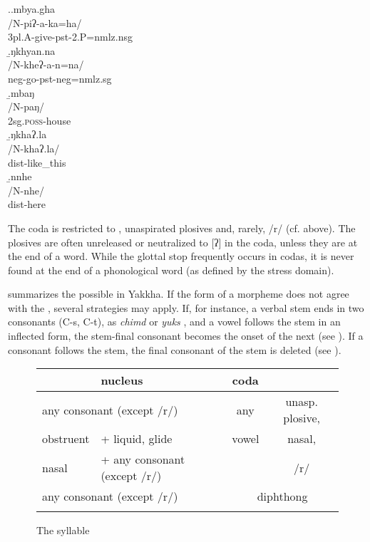 \ex.\a.\glll	mbya.gha\\
			/N-piʔ-a-ka=ha/\\
			{\sc 3pl.A-}give{\sc -pst-2.P=nmlz.nsg}\\
			\b.\glll ŋkhyan.na\\
			/N-kheʔ-a-n=na/\\
			{\sc neg-}go{\sc [3sg]-pst-neg=nmlz.sg}\\
			\b.\glll	mbaŋ\\
			/N-paŋ/\\
			{\sc 2sg.\textsc{poss}-}house\\
			\b.\glll ŋkhaʔ.la\\
			/N-khaʔ.la/\\
			{\sc dist-}like\_this\\
			\b.\glll  nnhe\\
			/N-nhe/\\
			{\sc dist-}here\\



The coda is restricted to , unaspirated plosives  and, rarely, /r/ (cf.  above). The plosives are often unreleased or neutralized to [ʔ] in the coda, unless they are at the end of a word. While the glottal stop frequently occurs in  codas, it  is never found at the end of a phonological word (as defined by the stress domain).  


 summarizes the possible  in Yakkha. If the form of a morpheme does not agree with the , several strategies may apply. If, for instance, a verbal stem ends in two consonants (C-s, C-t), as \emph{chimd}  or \emph{yuks} , and a vowel follows the stem in an inflected form, the stem-final consonant becomes the onset of the next  (see \Next). If a consonant follows the stem, the final consonant of the stem is deleted (see \NNext). 

 \begin{figure}[htp] 

\begin{tabular}{llcc}
\lsptoprule
\multicolumn{2}{l}{{\sc onset}}&{\sc nucleus}&{\sc coda}\\
\midrule
\multicolumn{2}{l}{any consonant (except /r/)}&any& unasp. plosive,\\
obstruent&+ liquid, glide&vowel&nasal,\\
nasal&+ any consonant (except /r/)& & /r/\\
\multicolumn{2}{l}{any consonant (except /r/)}&\multicolumn{2}{c}{diphthong}\\
\lspbottomrule
\end{tabular} 

\caption{The syllable}\label{syll} 
\end{figure}

